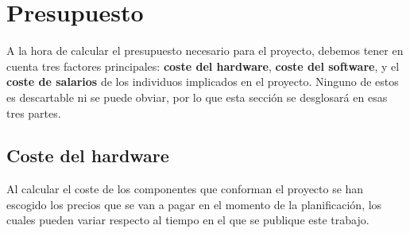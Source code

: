     \newpage
\section{Presupuesto}

A la hora de calcular el presupuesto necesario para el proyecto, debemos tener en cuenta tres factores principales: \textbf{coste del hardware}, \textbf{coste del software}, y el \textbf{coste de salarios} de los individuos implicados en el proyecto. Ninguno de estos es descartable ni se puede obviar, por lo que esta sección se desglosará en esas tres partes.
\subsection{Coste del hardware}

Al calcular el coste de los componentes que conforman el proyecto se han escogido los precios que se van a pagar en el momento de la planificación, los cuales pueden variar respecto al tiempo en el que se publique este trabajo. 


\begin{table}[H]
    \caption[Presupuesto de componentes]{Lista de componentes con coste. Elaboración propia}

    \end{table}


